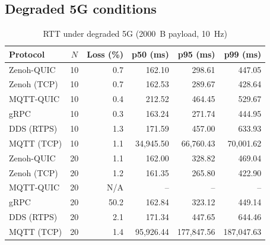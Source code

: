 \documentclass[11pt,a4paper]{article}
\begin{document}
\subsection{Degraded 5G conditions}

\begin{table}[H]
\centering
\caption{RTT under degraded 5G (2000~B payload, 10~Hz)}
\label{tab:degraded}
\begin{tabular}{lcrrrr}
\toprule
Protocol & $N$ & Loss (\%) & p50 (ms) & p95 (ms) & p99 (ms) \\
\midrule
Zenoh-QUIC  & 10 & 0.7 & 162.10     & 298.61     & 447.05 \\
Zenoh (TCP) & 10 & 0.7 & 162.53     & 289.67     & 428.64 \\
MQTT-QUIC   & 10 & 0.4 & 212.52     & 464.45     & 529.67 \\
gRPC        & 10 & 0.3 & 163.24     & 271.74     & 444.95 \\
DDS (RTPS)  & 10 & 1.3 & 171.59     & 457.00     & 633.93 \\
MQTT (TCP)  & 10 & 1.1 & 34{,}945.50 & 66{,}760.43 & 70{,}001.62 \\
\midrule
Zenoh-QUIC  & 20 & 1.1 & 162.00     & 328.82     & 469.04 \\
Zenoh (TCP) & 20 & 1.2 & 161.35     & 265.80     & 422.90 \\
MQTT-QUIC   & 20 & N/A\footnotemark & -- & -- & -- \\
gRPC        & 20 & 50.2 & 162.84     & 323.12     & 449.14 \\
DDS (RTPS)  & 20 & 2.1 & 171.34     & 447.65     & 644.46 \\
MQTT (TCP)  & 20 & 1.4 & 95{,}926.44 & 177{,}847.56 & 187{,}047.63 \\
\bottomrule
\end{tabular}
\end{table}
\end{document}
